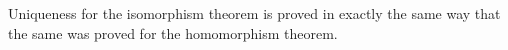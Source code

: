 \begin{code}
\AgdaOperator{\AgdaInductiveConstructor{,}}\AgdaSpace{}%
\AgdaSymbol{)}\AgdaSpace{}%
\AgdaSpace{}%
\AgdaSymbol{=}\<%
\\
\>[2][@{}l@{\AgdaIndent{0}}]%
\>[3]\AgdaSpace{}%
\AgdaSymbol{\{}\AgdaSpace{}%
\AgdaSymbol{=}\AgdaSpace{}%
\AgdaSpace{}%
\AgdaSpace{}%
\AgdaSpace{}%
\AgdaSpace{}%
\AgdaSpace{}%
\AgdaOperator{\AgdaInductiveConstructor{,}}\AgdaSpace{}%
\AgdaSymbol{\}}\AgdaSpace{}%
\AgdaSpace{}%
\AgdaSpace{}%
\AgdaSymbol{(}\AgdaSpace{}%
\AgdaSymbol{)}\AgdaSpace{}%
\<%
\\
%
\\[\AgdaEmptyExtraSkip]%
%
\>[2]\AgdaSpace{}%
\AgdaSymbol{:}\AgdaSpace{}%
\AgdaSpace{}%
\<%
\\
%
\>[2]\AgdaSpace{}%
\AgdaSymbol{=}\AgdaSpace{}%
\AgdaSpace{}%
\AgdaSpace{}%
\AgdaSpace{}%
\<%
\end{code}
\ccpad
Uniqueness for the isomorphism theorem is proved in exactly the same way
that the same was proved for the homomorphism theorem.
\ccpad
